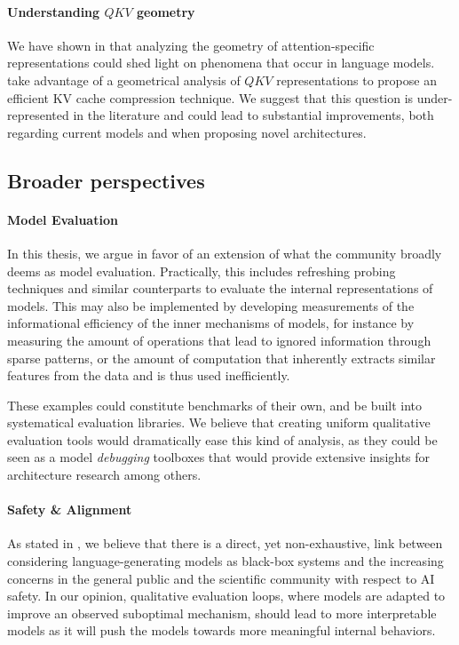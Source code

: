 \paragraph{Understanding $QKV$ geometry} We have shown in  that analyzing the geometry of attention-specific representations could shed light on phenomena that occur in language models. \citet{devoto2024simpleeffectivel2normbased} take advantage of a geometrical analysis of $QKV$ representations to propose an efficient KV cache compression technique. We suggest that this question is under-represented in the literature and could lead to substantial improvements, both regarding current models and when proposing novel architectures.


\subsection{Broader perspectives}

\paragraph{Model Evaluation} In this thesis, we argue in favor of an extension of what the community broadly deems as model evaluation. Practically, this includes refreshing probing techniques and similar counterparts to evaluate the internal representations of models. This may also be implemented by developing measurements of the informational efficiency of the inner mechanisms of models, for instance by measuring the amount of operations that lead to ignored information through sparse patterns, or the amount of computation that inherently extracts similar features from the data and is thus used inefficiently.

These examples could constitute benchmarks of their own, and be built into systematical evaluation libraries. We believe that creating uniform qualitative evaluation tools would dramatically ease this kind of analysis, as they could be seen as a model \textit{debugging} toolboxes that would provide extensive insights for architecture research among others.

\paragraph{Safety \& Alignment} As stated in , we believe that there is a direct, yet non-exhaustive, link between considering language-generating models as black-box systems and the increasing concerns in the general public and the scientific community with respect to AI safety. In our opinion, qualitative evaluation loops, where models are adapted to improve an observed suboptimal mechanism, should lead to more interpretable models as it will push the models towards more meaningful internal behaviors.

